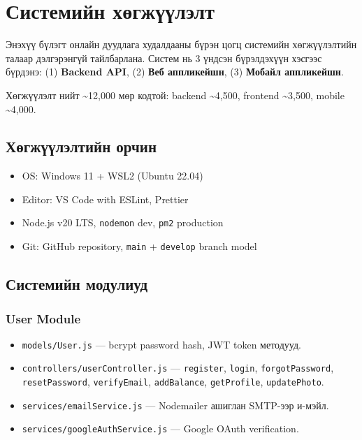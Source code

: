 \documentclass[12pt, a4paper]{report}
\begin{document}
\chapter{Системийн хөгжүүлэлт}

Энэхүү бүлэгт онлайн дуудлага худалдааны бүрэн цогц системийн хөгжүүлэлтийн талаар дэлгэрэнгүй тайлбарлана. Систем нь 3 үндсэн бүрэлдэхүүн хэсгээс бүрдэнэ: (1) \textbf{Backend API}, (2) \textbf{Веб аппликейшн}, (3) \textbf{Мобайл аппликейшн}.

Хөгжүүлэлт нийт \textasciitilde12,000 мөр кодтой: backend \textasciitilde4,500, frontend \textasciitilde3,500, mobile \textasciitilde4,000.

\section{Хөгжүүлэлтийн орчин}

\begin{itemize}
  \item OS: Windows 11 + WSL2 (Ubuntu 22.04)
  \item Editor: VS Code with ESLint, Prettier
  \item Node.js v20 LTS, \texttt{nodemon} dev, \texttt{pm2} production
  \item Git: GitHub repository, \texttt{main} + \texttt{develop} branch model
\end{itemize}

\section{Системийн модулиуд}

\subsection{User Module}

\begin{itemize}
  \item \texttt{models/User.js} — bcrypt password hash, JWT token методууд.
  \item \texttt{controllers/userController.js} — \texttt{register}, \texttt{login}, \texttt{forgotPassword}, \texttt{resetPassword}, \texttt{verifyEmail}, \texttt{addBalance}, \texttt{getProfile}, \texttt{updatePhoto}.
  \item \texttt{services/emailService.js} — Nodemailer ашиглан SMTP-ээр и-мэйл.
  \item \texttt{services/googleAuthService.js} — Google OAuth verification.
\end{itemize}
\end{document}
